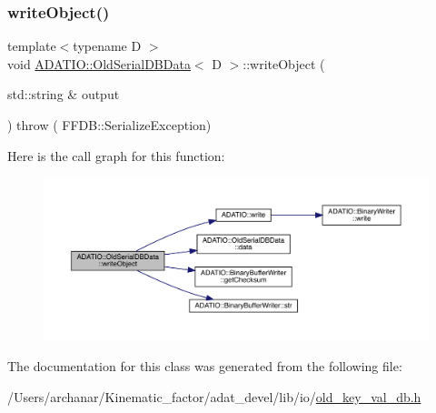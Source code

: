 \subsubsection{\texorpdfstring{writeObject()}{writeObject()}\hspace{0.1cm}{\footnotesize\ttfamily [2/2]}}
{\footnotesize\ttfamily template$<$typename D $>$ \\
void \mbox{\hyperlink{classADATIO_1_1OldSerialDBData}{A\+D\+A\+T\+I\+O\+::\+Old\+Serial\+D\+B\+Data}}$<$ D $>$\+::write\+Object (\begin{DoxyParamCaption}\item[{std\+::string \&}]{output }\end{DoxyParamCaption}) throw ( F\+F\+D\+B\+::\+Serialize\+Exception) \hspace{0.3cm}{\ttfamily [inline]}}

Here is the call graph for this function\+:
\nopagebreak
\begin{figure}[H]
\begin{center}
\leavevmode
\includegraphics[width=350pt]{da/dbc/classADATIO_1_1OldSerialDBData_aec52af4bfb6beb74fc039b9b25328270_cgraph}
\end{center}
\end{figure}


The documentation for this class was generated from the following file\+:\begin{DoxyCompactItemize}
\item 
/\+Users/archanar/\+Kinematic\+\_\+factor/adat\+\_\+devel/lib/io/\mbox{\hyperlink{lib_2io_2old__key__val__db_8h}{old\+\_\+key\+\_\+val\+\_\+db.\+h}}\end{DoxyCompactItemize}
